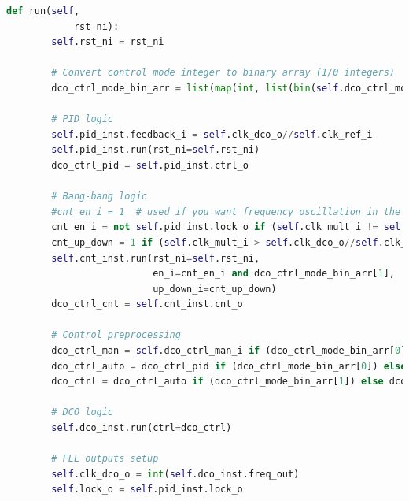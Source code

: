 \documentclass[master]{finthesis}
\def \FLL  {FLL} %
\begin{document}
\begin{lstlisting}[language=Python, caption={Имплементација модела \FLL\ компоненте.}, label={lst:py:fll}]
    def run(self,
            rst_ni):
        self.rst_ni = rst_ni

        # Convert control mode integer to binary array (1/0 integers) 
        dco_ctrl_mode_bin_arr = list(map(int, list(bin(self.dco_ctrl_mode_i)[2:][::-1])))

        # PID logic
        self.pid_inst.feedback_i = self.clk_dco_o//self.clk_ref_i
        self.pid_inst.run(rst_ni=self.rst_ni)
        dco_ctrl_pid = self.pid_inst.ctrl_o

        # Bang-bang logic
        #cnt_en_i = 1  # used if you want frequency oscillation in the stable state
        cnt_en_i = not self.pid_inst.lock_o if (self.clk_mult_i != self.clk_dco_o//self.clk_ref_i) else 0
        cnt_up_down = 1 if (self.clk_mult_i > self.clk_dco_o//self.clk_ref_i) else 0
        self.cnt_inst.run(rst_ni=self.rst_ni,
                          en_i=cnt_en_i and dco_ctrl_mode_bin_arr[1],
                          up_down_i=cnt_up_down)
        dco_ctrl_cnt = self.cnt_inst.cnt_o

        # Control preprocessing
        dco_ctrl_man = self.dco_ctrl_man_i if (dco_ctrl_mode_bin_arr[0]) else 203
        dco_ctrl_auto = dco_ctrl_pid if (dco_ctrl_mode_bin_arr[0]) else dco_ctrl_cnt
        dco_ctrl = dco_ctrl_auto if (dco_ctrl_mode_bin_arr[1]) else dco_ctrl_man

        # DCO logic
        self.dco_inst.run(ctrl=dco_ctrl)

        # FLL outputs setup
        self.clk_dco_o = int(self.dco_inst.freq_out)
        self.lock_o = self.pid_inst.lock_o
\end{lstlisting}
\end{document}
